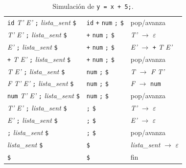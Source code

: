 \documentclass[12pt]{article}
\newcommand{\cmd}[1]{\texttt{\small #1}}
\newcommand{\nt}[1]{\textit{#1}}
\begin{document}
\begin{table}[!htbp]
\begin{tabular}{@{}>{\raggedright\arraybackslash}p{5.0cm} >{\raggedright\arraybackslash}p{3.7cm} >{\raggedright\arraybackslash}p{5.6cm}@{}}
\texttt{id} \nt{T'} \nt{E'} \texttt{;} \nt{lista\_sent} \texttt{\$} & \texttt{id} \texttt{+} \texttt{num} \texttt{;} \texttt{\$} & pop/avanza \\
\nt{T'} \nt{E'} \texttt{;} \nt{lista\_sent} \texttt{\$} & \texttt{+} \texttt{num} \texttt{;} \texttt{\$} & \nt{T'} $\rightarrow$ $\varepsilon$ \\
\nt{E'} \texttt{;} \nt{lista\_sent} \texttt{\$} & \texttt{+} \texttt{num} \texttt{;} \texttt{\$} & \nt{E'} $\rightarrow$ \texttt{+} \nt{T} \nt{E'} \\
\texttt{+} \nt{T} \nt{E'} \texttt{;} \nt{lista\_sent} \texttt{\$} & \texttt{+} \texttt{num} \texttt{;} \texttt{\$} & pop/avanza \\
\nt{T} \nt{E'} \texttt{;} \nt{lista\_sent} \texttt{\$} & \texttt{num} \texttt{;} \texttt{\$} & \nt{T} $\rightarrow$ \nt{F} \nt{T'} \\
\nt{F} \nt{T'} \nt{E'} \texttt{;} \nt{lista\_sent} \texttt{\$} & \texttt{num} \texttt{;} \texttt{\$} & \nt{F} $\rightarrow$ \texttt{num} \\
\texttt{num} \nt{T'} \nt{E'} \texttt{;} \nt{lista\_sent} \texttt{\$} & \texttt{num} \texttt{;} \texttt{\$} & pop/avanza \\
\nt{T'} \nt{E'} \texttt{;} \nt{lista\_sent} \texttt{\$} & \texttt{;} \texttt{\$} & \nt{T'} $\rightarrow$ $\varepsilon$ \\
\nt{E'} \texttt{;} \nt{lista\_sent} \texttt{\$} & \texttt{;} \texttt{\$} & \nt{E'} $\rightarrow$ $\varepsilon$ \\
\texttt{;} \nt{lista\_sent} \texttt{\$} & \texttt{;} \texttt{\$} & pop/avanza \\
\nt{lista\_sent} \texttt{\$} & \texttt{\$} & \nt{lista\_sent} $\rightarrow$ $\varepsilon$ \\
\texttt{\$} & \texttt{\$} & fin \\
\bottomrule
\end{tabular}
\caption{Simulación de \cmd{y = x + 5;}.}
\label{tab:sim1}
\end{table}
\end{document}
